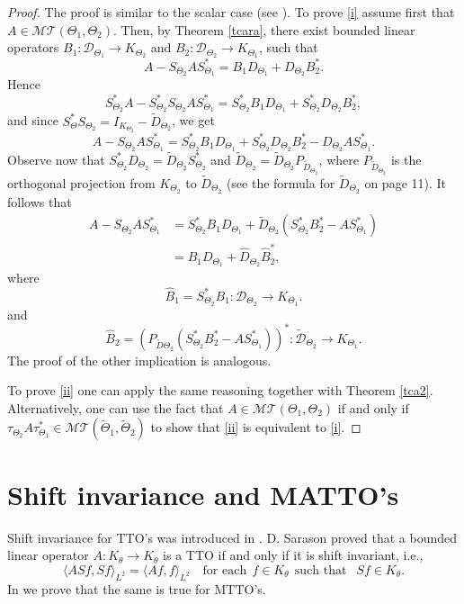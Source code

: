 \documentclass[11pt]{amsart}
\numberwithin{equation}{section}
\theoremstyle{definition}
\numberwithin{equation}{section}
\begin{document}
\begin{proof}
The proof is similar to the scalar case (see \cite{BM}). To prove \eqref{i} assume first that $A\in \mathcal{MT}(\Theta_1, \Theta_2)$. Then, by Theorem \ref{tcara}, there exist bounded linear operators $B_1:\mathcal{D}_{\Theta_1}\to K_{\Theta_2}$ and $B_2:\mathcal{D}_{\Theta_2}\to K_{\Theta_1}$, such that $$A-S_{\Theta_2}AS_{\Theta_1}^*=B_1D_{\Theta_1}+D_{\Theta_2}B_2^*.$$
Hence $$S^*_{\Theta_2}A-S^*_{\Theta_2}S_{\Theta_2}AS_{\Theta_1}^*=S^*_{\Theta_2}B_1D_{\Theta_1}+S^*_{\Theta_2}D_{\Theta_2}B_2^*,$$
and since $S_{\Theta}^*S_{\Theta_2}=I_{K_{\Theta_2}}-\widetilde{D}_{\Theta_2}$, we get
$$A-S_{\Theta_2}AS_{\Theta_1}^*=S^*_{\Theta_2}B_1D_{\Theta_1}+S^*_{\Theta_2}D_{\Theta_2}B_2^*-D_{\Theta_2}AS^*_{\Theta_1}.$$
Observe now that $S^*_{\Theta_2}D_{\Theta_2}=\widetilde{D}_{\Theta_2}S^*_{\Theta_2}$ and $\widetilde{D}_{\Theta_2}=\widetilde{D}_{\Theta_2}P_{\widetilde{D}_{\Theta_2}}$, where $P_{\widetilde{D}_{\Theta_2}}$ is the orthogonal projection from $K_{\Theta_2}$ to $\widetilde{D}_{\Theta_2}$ (see the formula for $\widetilde{D}_{\Theta_2}$ on page 11). It follows that
\begin{align*}
A-S_{\Theta_2}AS_{\Theta_1}^*
&=S^*_{\Theta_2}B_1D_{\Theta_1}+\widetilde{D}_{\Theta_2}(S_{\Theta_2}^*B_2^*-AS_{\Theta_1}^*)\\
&=\widehat{B}_1D_{\Theta_1}+\widehat{D}_{\Theta_2}\widehat{B}^*_{2},
\end{align*}
where $$\widehat{B}_1=S^*_{\Theta_2}B_1: \mathcal{D}_{\Theta_2}\to K_{\Theta_1}.$$
and
$$\widehat{B}_2=(P_{\widetilde{D}{\Theta_2}}(S^*_{\Theta_2}B^*_2-AS^*_{\Theta_1}))^*:\widetilde{\mathcal{D}}_{\Theta_2}\to K_{\Theta_1}.$$
The proof of the other implication is analogous.

To prove \eqref{ii} one can apply the same reasoning together with Theorem \ref{tca2}. Alternatively, one can use the fact that $A\in \mathcal{MT}(\Theta_1, \Theta_2)$ if and only if $\tau_{\Theta_2}A\tau^*_{\Theta_1}\in \mathcal{MT}(\widetilde{\Theta}_1, \widetilde{\Theta}_2)$ to show that \eqref{ii} is equivalent to \eqref{i}.
\end{proof}
\section{Shift invariance and MATTO's}
Shift invariance for TTO's was introduced in \cite{sar}. D. Sarason proved that a bounded linear operator $A:K_\theta\to K_\theta$ is a TTO if and only if it is shift invariant, i.e.,
$$\langle ASf, Sf\rangle_{L^2}=\langle Af, f\rangle_{L^2} \quad \text{for each} ~~f\in K_\theta~~ \text{such that }~~ Sf\in K_\theta.$$
In \cite{KT} we prove that the same is true for MTTO's.
\end{document}
